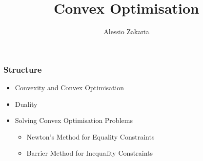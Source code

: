 \documentclass{beamer}
\title{Convex Optimisation}
\author{Alessio Zakaria}
\date{}
\begin{document}
\begin{frame}
    \titlepage
\end{frame}

\begin{frame}
    \frametitle{Structure}
    \begin{itemize}
        \item Convexity and Convex Optimisation
        \item Duality
        \item Solving Convex Optimisation Problems
            \begin{itemize}
                \item Newton's Method for Equality Constraints
                \item Barrier Method for Inequality Constraints
            \end{itemize}
    \end{itemize}
\end{frame}
\end{document}
